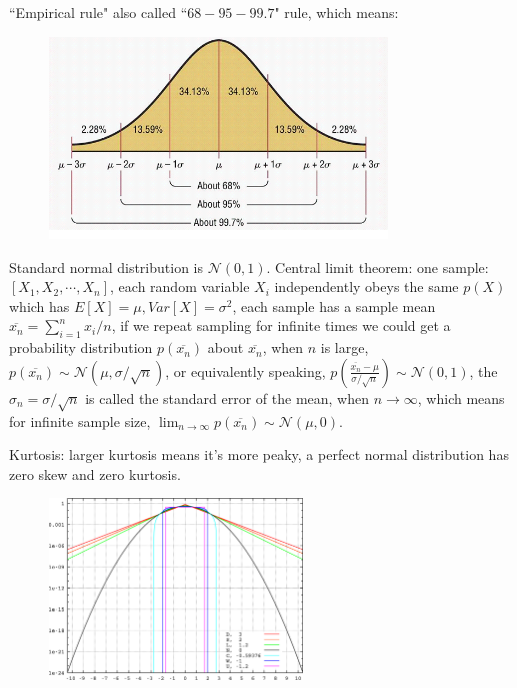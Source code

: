 \documentclass{llncs}
\begin{document}
``Empirical rule" also called ``$68-95-99.7$" rule, which means:
\begin{figure}
\centering
\includegraphics[width=0.8\textwidth]{EmpiricalRule.png}
\end{figure}

Standard normal distribution is $\mathcal{N}(0,1)$. 
Central limit theorem: one sample: $[X_1,X_2,\cdots,X_n]$, each random variable $X_i$ independently obeys the same $p(X)$ which has $E[X]=\mu, Var[X]=\sigma^2$, each sample has a sample mean $\overline{x_n}=\sum_{i=1}^{n}x_i/n$, if we repeat sampling for infinite times we could get a probability distribution $p(\overline{x_n})$ about $\overline{x_n}$, when $n$ is large, $p(\overline{x_n})\sim\mathcal{N}(\mu,\sigma/\sqrt{n})$, or equivalently speaking, $p(\frac{\overline{x_n}-\mu}{\sigma/\sqrt{n}})\sim\mathcal{N}(0,1)$, the $\sigma_n=\sigma/\sqrt{n}$ is called the standard error of the mean, when $n\rightarrow\infty$, which means for infinite sample size, $\lim_{n\rightarrow\infty}p(\overline{x_n})\sim\mathcal{N}(\mu,0)$. 

Kurtosis: larger kurtosis means it's more peaky, a perfect normal distribution has zero skew and zero kurtosis.
\begin{figure}
\centering
\includegraphics[width=0.6\textwidth]{kurtosis.png}
\end{figure}
\end{document}
